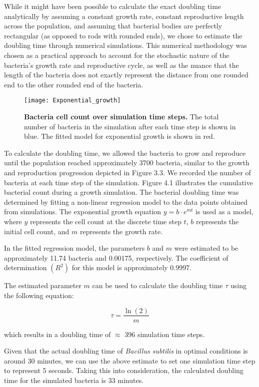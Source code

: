 While it might have been possible to calculate the exact doubling time analytically by assuming a constant growth rate, constant reproductive length across the population, and assuming that bacterial bodies are perfectly rectangular (as opposed to rods with rounded ends), we chose to estimate the doubling time through numerical simulations. This numerical methodology was chosen as a practical approach to account for the stochastic nature of the bacteria's growth rate and reproductive cycle, as well as the nuance that the length of the bacteria does not exactly represent the distance from one rounded end to the other rounded end of the bacteria.

\begin{figure}[h]
    \centering
    \texttt{[image: Exponential\_growth]}
    \caption{\footnotesize \textbf{Bacteria cell count over simulation time steps.} The total number of bacteria in the simulation after each time step is shown in blue. The fitted model for exponential growth is shown in red.}

\end{figure}

To calculate the doubling time, we allowed the bacteria to grow and reproduce until the population reached approximately 3700 bacteria, similar to the growth and reproduction progression depicted in Figure 3.3. We recorded the number of bacteria at each time step of the simulation. Figure 4.1 illustrates the cumulative bacterial count during a growth simulation. The bacterial doubling time was determined by fitting a non-linear regression model to the data points obtained from simulations. The exponential growth equation \(y = b \cdot e^{mt}\) is used as a model, where \(y\) represents the cell count at the discrete time step \(t\), \(b\) represents the initial cell count, and \(m\) represents the growth rate.

In the fitted regression model, the parameters \(b\) and \(m\) were estimated to be approximately 11.74 bacteria and 0.00175, respectively. The coefficient of determination $(R^2)$ for this model is approximately 0.9997.

The estimated parameter \(m\) can be used to calculate the doubling time \(\tau\) using the following equation:


\[
    \tau=\frac{{\ln(2)}}{m} 
\]

which results in a doubling time of $\approx$ 396 simulation time steps.


Given that the actual doubling time of \textit{Bacillus subtilis} in optimal conditions is around 30 minutes, we can use the above estimate to set one simulation time step to represent 5 seconds. Taking this into consideration, the calculated doubling time for the simulated bacteria is 33 minutes.





